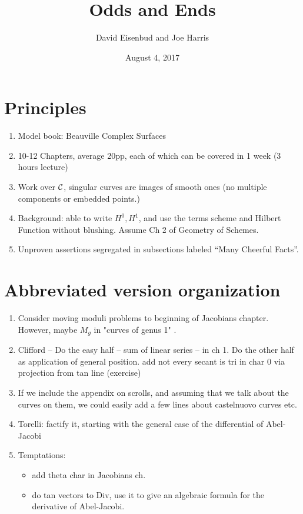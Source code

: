 \documentclass[12pt, leqno]{book}
\date{August 4, 2017}
\title{Odds and Ends}
\author{David Eisenbud and Joe Harris }
\begin{document}
\maketitle

\setlength{\parskip}{5pt}

\section{Principles}
\begin{enumerate}

\item Model book: Beauville Complex Surfaces

\item 10-12 Chapters, average 20pp, each of which can be covered in 1 week (3 hours lecture)

\item Work over $\cC$, singular curves are images of smooth ones (no multiple components or embedded points.)

\item Background: able to write $H^0, H^1$, and use the terms scheme and Hilbert Function  without blushing. Assume Ch 2 of Geometry of Schemes.

\item Unproven assertions segregated in subsections labeled ``Many Cheerful Facts''.
\end{enumerate}

\section{Abbreviated version organization}
\begin{enumerate}
\item Consider moving moduli problems to beginning of Jacobians chapter. However, maybe $M_g$ in "curves of genus 1" .

\item Clifford -- Do the easy half -- sum of linear series -- in ch 1. Do the other half as application of general position. add not every secant is tri in char 0 via projection from tan line (exercise)
\item If we include the appendix on scrolls, and assuming that we talk about the curves on them, we could easily add a few lines about castelnuovo curves etc.


\item Torelli: factify it, starting with the general case of the differential of Abel-Jacobi

\item Temptations: 
	
\begin{itemize}
 \item add theta char in Jacobians ch. 
\item do tan vectors to Div, use it to give an algebraic formula for the derivative of Abel-Jacobi.
\end{itemize}
 

\end{enumerate}
\end{document}
